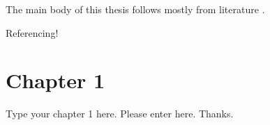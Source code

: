 
The main body of this thesis follows mostly from literature \cite{Losev}.

Referencing!

\section{Chapter 1}

Type your chapter 1 here.
Please enter here. Thanks.
